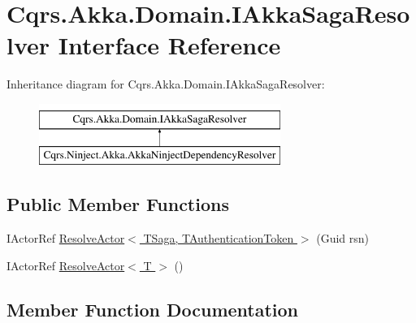 \hypertarget{interfaceCqrs_1_1Akka_1_1Domain_1_1IAkkaSagaResolver}{}\section{Cqrs.\+Akka.\+Domain.\+I\+Akka\+Saga\+Resolver Interface Reference}
\label{interfaceCqrs_1_1Akka_1_1Domain_1_1IAkkaSagaResolver}
Inheritance diagram for Cqrs.\+Akka.\+Domain.\+I\+Akka\+Saga\+Resolver\+:\begin{figure}[H]
\begin{center}
\leavevmode
\includegraphics[height=2.000000cm]{interfaceCqrs_1_1Akka_1_1Domain_1_1IAkkaSagaResolver}
\end{center}
\end{figure}
\subsection*{Public Member Functions}
\begin{DoxyCompactItemize}
\item 
I\+Actor\+Ref \hyperlink{interfaceCqrs_1_1Akka_1_1Domain_1_1IAkkaSagaResolver_ab41671bdbd0d7d83552b5e11e47fe36d}{Resolve\+Actor$<$ T\+Saga, T\+Authentication\+Token $>$} (Guid rsn)
\item 
I\+Actor\+Ref \hyperlink{interfaceCqrs_1_1Akka_1_1Domain_1_1IAkkaSagaResolver_adb17ca8a4e09839e67bc9fa0a6ee843f}{Resolve\+Actor$<$ T $>$} ()
\end{DoxyCompactItemize}


\subsection{Member Function Documentation}
\mbox{\label{interfaceCqrs_1_1Akka_1_1Domain_1_1IAkkaSagaResolver_adb17ca8a4e09839e67bc9fa0a6ee843f}} 
